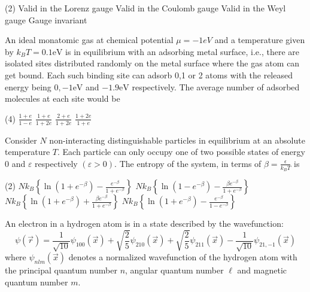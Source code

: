 \begin{questions}
\begin{tasks}(2)
	\task[\textbf{A.}] Valid in the Lorenz gauge
	\task[\textbf{B.}] Valid in the Coulomb gauge
	\task[\textbf{C.}] Valid in the Weyl gauge
	\task[\textbf{D.}] Gauge invariant
\end{tasks}
\begin{minipage}{\textwidth}
	\question An ideal monatomic gas at chemical potential $\mu=-1 e V$ and a temperature given by $k_{B} T=0.1 \mathrm{eV}$ is in equilibrium with an adsorbing metal surface, i.e., there are isolated sites distributed randomly on the metal surface where the gas atom can get bound. Each such binding site can adsorb 0,1 or 2 atoms with the released energy being $0,-1 \mathrm{eV}$ and $-1.9 \mathrm{eV}$ respectively. The average number of adsorbed molecules at each site would be
\end{minipage}
\begin{tasks}(4)
	\task[\textbf{A.}] $\frac{1+e}{1-e}$
	\task[\textbf{B.}] $\frac{1+e}{1+2 e}$
	\task[\textbf{C.}] $\frac{2+e}{1+2 e}$
	\task[\textbf{D.}] $\frac{1+2 e}{1+e}$
\end{tasks}
\begin{minipage}{\textwidth}
	\question Consider $N$ non-interacting distinguishable particles in equilibrium at an absolute temperature $T$. Each particle can only occupy one of two possible states of energy 0 and $\varepsilon$ respectively $(\varepsilon>0)$. The entropy of the system, in terms of $\beta=\frac{\epsilon}{k_{B} T}$ is
\end{minipage}
\begin{tasks}(2)
	\task[\textbf{A.}]   $N k_{B}\left\{\ln \left(1+e^{-\beta}\right)-\frac{e^{-\beta}}{1+e^{-\beta}}\right\}$
	\task[\textbf{B.}] $N k_{B}\left\{\ln \left(1-e^{-\beta}\right)-\frac{\beta e^{-\beta}}{1+e^{-\beta}}\right\}$
	\task[\textbf{C.}] $N k_{B}\left\{\ln \left(1+e^{-\beta}\right)+\frac{\beta e^{-\beta}}{1+e^{-\beta}}\right\}$
	\task[\textbf{D.}] $N k_{B}\left\{\ln \left(1+e^{-\beta}\right)-\frac{e^{-\beta}}{1-e^{-\beta}}\right\}$
\end{tasks}
\begin{minipage}{\textwidth}
	\question An electron in a hydrogen atom is in a state described by the wavefunction:
	$$
	\psi(\vec{r})=\frac{1}{\sqrt{10}} \psi_{100}(\vec{x})+\sqrt{\frac{2}{5}} \psi_{210}(\vec{x})+\sqrt{\frac{2}{5}} \psi_{211}(\vec{x})-\frac{1}{\sqrt{10}} \psi_{21,-1}(\vec{x})
	$$
	where $\psi_{n l m}(\vec{x})$ denotes a normalized wavefunction of the hydrogen atom with the principal quantum number $n$, angular quantum number $\ell$ and magnetic quantum number $m$.

\end{minipage}
\end{questions}
